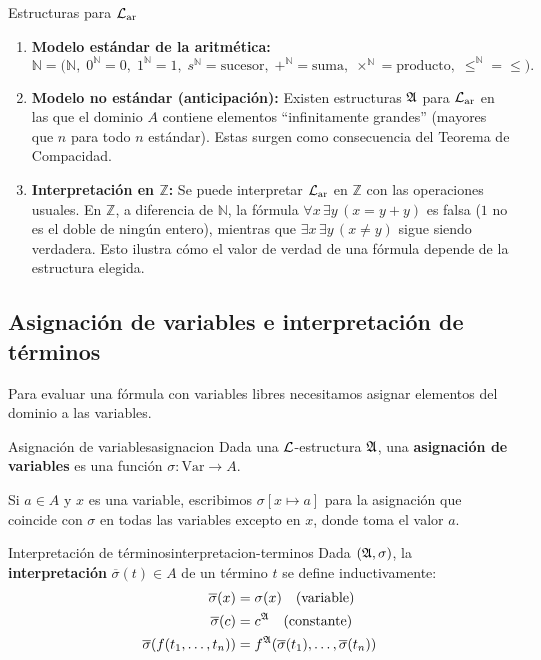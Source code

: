 \begin{ejemplo}{Estructuras para $\mathcal{L}_{\mathrm{ar}}$}{}
\begin{enumerate}[leftmargin=2em, label=(\alph*)]
  \item \textbf{Modelo estándar de la aritmética:}
  \[
    \mathbb{N} = \bigl(\mathbb{N},\; 0^{\mathbb{N}}=0,\; 1^{\mathbb{N}}=1,\; s^{\mathbb{N}}=\mathrm{sucesor},\; +^{\mathbb{N}}=\mathrm{suma},\; \times^{\mathbb{N}}=\mathrm{producto},\; \leq^{\mathbb{N}}={\leq}\bigr).
  \]
  \item \textbf{Modelo no estándar (anticipación):} Existen estructuras $\mathfrak{A}$ para $\mathcal{L}_{\mathrm{ar}}$ en las que el dominio $A$ contiene elementos ``infinitamente grandes'' (mayores que $n$ para todo $n$ estándar). Estas surgen como consecuencia del Teorema de Compacidad.
  \item \textbf{Interpretación en $\mathbb{Z}$:} Se puede interpretar $\mathcal{L}_{\mathrm{ar}}$ en $\mathbb{Z}$ con las operaciones usuales. En $\mathbb{Z}$, a diferencia de $\mathbb{N}$, la fórmula $\forall x\, \exists y\, (x = y + y)$ es falsa ($1$ no es el doble de ningún entero), mientras que $\exists x\, \exists y\, (x \neq y)$ sigue siendo verdadera. Esto ilustra cómo el valor de verdad de una fórmula depende de la estructura elegida.
\end{enumerate}
\end{ejemplo}

\subsection{Asignación de variables e interpretación de términos}

Para evaluar una fórmula con variables libres necesitamos asignar elementos del dominio a las variables.

\begin{definicion}{Asignación de variables}{asignacion}
Dada una $\mathcal{L}$-estructura $\mathfrak{A}$, una \textbf{asignación de variables} es una función $\sigma : \mathrm{Var} \to A$.

Si $a \in A$ y $x$ es una variable, escribimos $\sigma[x \mapsto a]$ para la asignación que coincide con $\sigma$ en todas las variables excepto en $x$, donde toma el valor $a$.
\end{definicion}

\begin{definicion}{Interpretación de términos}{interpretacion-terminos}
Dada $(\mathfrak{A}, \sigma)$, la \textbf{interpretación} $\overline{\sigma}(t) \in A$ de un término $t$ se define inductivamente:
\begin{align*}
  \overline{\sigma}(x) &= \sigma(x) \quad \text{(variable)} \\
  \overline{\sigma}(c) &= c^{\mathfrak{A}} \quad \text{(constante)} \\
  \overline{\sigma}(f(t_1,\ldots,t_n)) &= f^{\mathfrak{A}}(\overline{\sigma}(t_1),\ldots,\overline{\sigma}(t_n))
\end{align*}
\end{definicion}

